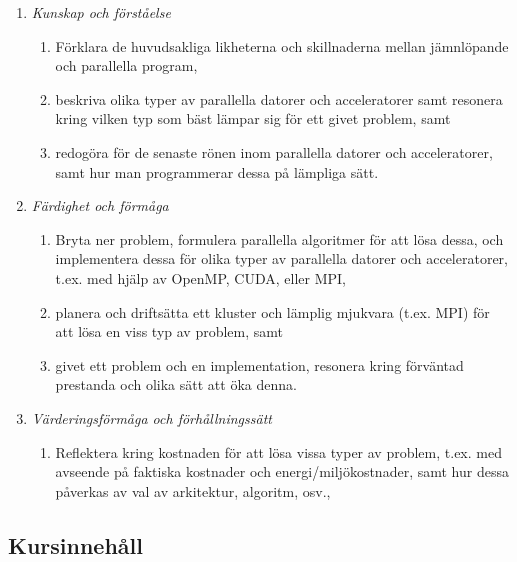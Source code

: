 \begin{enumerate}
\def\labelenumi{\Alph{enumi}.}
\tightlist
\item
  \emph{Kunskap och förståelse}

  \begin{enumerate}
  \def\labelenumii{\Alph{enumi}.\arabic{enumii}.}
  \tightlist
  \item
    Förklara de huvudsakliga likheterna och skillnaderna mellan
    jämnlöpande och parallella program,
  \item
    beskriva olika typer av parallella datorer och acceleratorer samt
    resonera kring vilken typ som bäst lämpar sig för ett givet problem,
    samt
  \item
    redogöra för de senaste rönen inom parallella datorer och
    acceleratorer, samt hur man programmerar dessa på lämpliga sätt.
  \end{enumerate}
\item
  \emph{Färdighet och förmåga}

  \begin{enumerate}
  \def\labelenumii{\Alph{enumi}.\arabic{enumii}.}
  \tightlist
  \item
    Bryta ner problem, formulera parallella algoritmer för att lösa
    dessa, och implementera dessa för olika typer av parallella datorer
    och acceleratorer, t.ex. med hjälp av OpenMP, CUDA, eller MPI,
  \item
    planera och driftsätta ett kluster och lämplig mjukvara (t.ex. MPI)
    för att lösa en viss typ av problem, samt
  \item
    givet ett problem och en implementation, resonera kring förväntad
    prestanda och olika sätt att öka denna.
  \end{enumerate}
\item
  \emph{Värderingsförmåga och förhållningssätt}

  \begin{enumerate}
  \def\labelenumii{\Alph{enumi}.\arabic{enumii}.}
  \tightlist
  \item
    Reflektera kring kostnaden för att lösa vissa typer av problem,
    t.ex. med avseende på faktiska kostnader och energi/miljökostnader,
    samt hur dessa påverkas av val av arkitektur, algoritm, osv.,
  \end{enumerate}
\end{enumerate}

\subsection*{Kursinnehåll}

